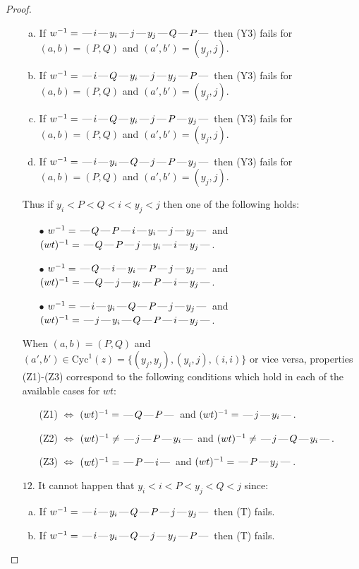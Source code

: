 \documentclass[10pt]{article}
\theoremstyle{definition}
\theoremstyle{definition}
\def\dash{\text{\hspace{0.5mm}---\hspace{0.5mm}}}
\def\Cyc{\mathrm{Cyc}}
\begin{document}
\begin{proof}
\begin{enumerate}
\begin{enumerate}[(a)]
\item If $w^{-1} = \dash i\dash y_i\dash j\dash y_j\dash Q\dash P\dash $ then (Y3) fails for $(a,b)=(P,Q)$ and $(a',b')=(y_j,j)$.
\item If $w^{-1} = \dash i\dash Q\dash y_i\dash j\dash y_j\dash P\dash $ then (Y3) fails for $(a,b)=(P,Q)$ and $(a',b')=(y_j,j)$.
\item If $w^{-1} = \dash i\dash Q\dash y_i\dash j\dash P\dash y_j\dash $ then (Y3) fails for $(a,b)=(P,Q)$ and $(a',b')=(y_j,j)$.
\item If $w^{-1} = \dash i\dash y_i\dash Q\dash j\dash P\dash y_j\dash $ then (Y3) fails for $(a,b)=(P,Q)$ and $(a',b')=(y_j,j)$.
\end{enumerate}
Thus if $y_i < P < Q < i < y_j < j$ then one of the following holds:
\begin{enumerate}
\item[$\bullet$] $w^{-1} = \dash Q\dash P\dash i\dash y_i\dash j\dash y_j\dash $ and $(wt)^{-1} = \dash Q\dash P\dash j\dash y_i\dash i\dash y_j\dash $.
\item[$\bullet$] $w^{-1} = \dash Q\dash i\dash y_i\dash P\dash j\dash y_j\dash $ and $(wt)^{-1} = \dash Q\dash j\dash y_i\dash P\dash i\dash y_j\dash $.
\item[$\bullet$] $w^{-1} = \dash i\dash y_i\dash Q\dash P\dash j\dash y_j\dash $ and $(wt)^{-1} = \dash j\dash y_i\dash Q\dash P\dash i\dash y_j\dash $.
\end{enumerate}
When $(a,b)= (P,Q)$ and $(a',b')\in \Cyc^1(z)=\{(y_j,y_j),(y_i,j),(i,i)\}$ or vice versa,
properties (Z1)-(Z3) correspond to the following conditions which
hold in each of the available cases for $wt$:
\begin{enumerate}
\item[](Z1) $\Leftrightarrow$ $(wt)^{-1} = \dash Q \dash P \dash$  and $(wt)^{-1} = \dash j \dash y_i \dash$.
\item[](Z2) $\Leftrightarrow$ $(wt)^{-1} \neq \dash j \dash P \dash y_i \dash$ and $(wt)^{-1}\neq \dash j \dash Q \dash y_i \dash$.
\item[](Z3) $\Leftrightarrow$ $(wt)^{-1} = \dash P \dash i \dash$  and $(wt)^{-1} = \dash P \dash y_j \dash$.
\end{enumerate}
\item[$12$.] It cannot happen that $y_i < i < P < y_j < Q < j$ since:
\begin{enumerate}[(a)]
\item If $w^{-1} = \dash i\dash y_i\dash Q\dash P\dash j\dash y_j\dash $ then (T) fails.
\item If $w^{-1} = \dash i\dash y_i\dash Q\dash j\dash y_j\dash P\dash $ then (T) fails.

\end{enumerate}
\end{enumerate}
\end{proof}
\end{document}
